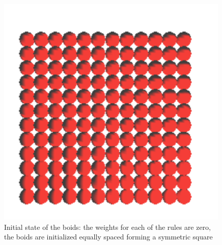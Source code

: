\begin{figure}[htbp]
\begin{center}
\includegraphics[scale=0.5]{figures/align.pdf}
\caption{Initial state of the boids: the weights for each of the rules are zero, the boids are initialized equally spaced forming a symmetric square}
\label{alignRule}
\end{center}
\end{figure}

